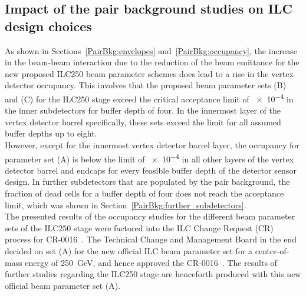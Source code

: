 \subsection{Impact of the pair background studies on ILC design choices}
As shown in Sections~\ref{PairBkg:envelopes} and~\ref{PairBkg:occupancy}, the increase in the beam-beam interaction due to the reduction of the beam emittance for the new proposed ILC250 beam parameter schemes does lead to a rise in the \sid vertex detector occupancy.
This involves that the proposed beam parameter sets (B) and (C) for the ILC250 stage exceed the critical acceptance limit of \num{e-4} in the inner subdetectors for buffer depth of four. 
In the innermost layer of the vertex detector barrel specifically, these sets exceed the limit for all assumed buffer depths up to eight.
\\However, except for the innermost vertex detector barrel layer, the occupancy for parameter set (A) is below the limit of \num{e-4} in all other layers of the vertex detector barrel and endcaps for every feasible buffer depth of the detector sensor design.
In further \sid subdetectors that are populated by the pair background, the fraction of dead cells for a buffer depth of four does not reach the acceptance limit, which was shown in Section~\ref{PairBkg:further_subdetectors}.
\\The presented results of the \sid occupancy studies for the different beam parameter sets of the ILC250 stage were factored into the ILC Change Request (CR) process for CR-0016~\cite{CR-0016}.
The Technical Change and Management Board in the end decided on set (A) for the new official ILC beam parameter set for a center-of-mass energy of \SI{250}{\GeV}, and hence approved the CR-0016~\cite{LCWS17_TCMBmeeting}.
The results of further studies regarding the ILC250 stage are henceforth produced with this new official beam parameter set (A).


